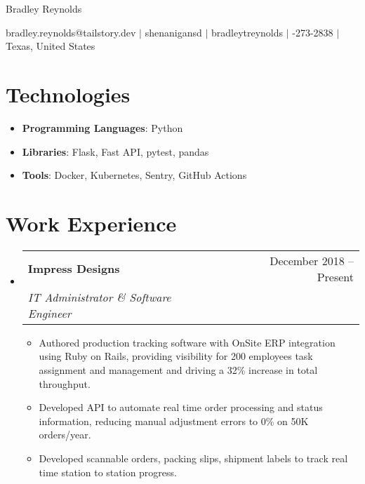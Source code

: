 \documentclass[letterpaper,11pt]{article}
\makeatletter
\newcommand{\resumeItem}[1]{
  \item\small{
    {#1 \vspace{-2pt}}
  }
}
\newcommand{\resumeSubheading}[4]{
  \vspace{-2pt}\item
    \begin{tabular*}{0.97\textwidth}[t]{l@{\extracolsep{\fill}}r}
      \textbf{#1} & #2 \\
      \textit{\small#3} & \textit{\small #4} \\
    \end{tabular*}\vspace{-7pt}
}
\newcommand{\resumeSubItem}[1]{\resumeItem{#1}\vspace{-4pt}}
\newcommand{\resumeSubheadingListStart}{\begin{itemize}[leftmargin=0.15in, label={}]}
\newcommand{\resumeSubheadingListEnd}{\end{itemize}}
\newcommand{\resumeItemListStart}{\begin{itemize}}
\newcommand{\resumeItemListEnd}{\end{itemize}}
\newcommand{\myemail}{bradley.reynolds@tailstory.dev}
\newcommand{\myname}{Bradley Reynolds}
\newcommand{\mygh}{shenanigansd}
\newcommand{\mylinkedin}{bradleytreynolds}
\newcommand{\myphone}{940-273-2838}
\newcommand{\mylocation}{Texas, United States}
\makeatother
\begin{document}
{\Huge \myname}
\\
\vspace{2pt}

\small{
    \faEnvelope
    \thinspace \thinspace
    \myemail
    \thinspace \thinspace $|$
    \faGithub
    \thinspace \thinspace
    \mygh
    \thinspace \thinspace $|$
    \faLinkedin
    \thinspace \thinspace
    \mylinkedin
    \thinspace \thinspace $|$
    \faPhone
    \thinspace \thinspace
    \myphone
    \thinspace \thinspace $|$
    \thinspace \thinspace
    \mylocation
}

\vspace{-11pt}

\section{Technologies}
\resumeSubheadingListStart
    \resumeSubItem{\textbf{Programming Languages}{:
        Python
    }} \\
    \resumeSubItem{\textbf{Libraries}{:
        Flask,
        Fast API,
        pytest,
        pandas
    }} \\
    \resumeSubItem{\textbf{Tools}{:
        Docker,
        Kubernetes,
        Sentry,
        GitHub Actions
    }}
\resumeSubheadingListEnd

\section{Work Experience}
    \resumeSubheadingListStart
        \resumeSubheading{Impress Designs}{December 2018 -- Present}{IT Administrator \& Software Engineer}{}
        \resumeItemListStart
            \resumeItem{Authored production tracking software with OnSite ERP integration using Ruby on Rails, providing visibility for 200 employees task assignment and management and driving a 32\% increase in total throughput.}
            \resumeItem{Developed API to automate real time order processing and status information, reducing manual adjustment errors to 0\% on 50K orders/year.}
            \resumeItem{Developed scannable orders, packing slips, shipment labels to track real time station to station progress.}
        \resumeItemListEnd
    \resumeSubheadingListEnd
\end{document}
